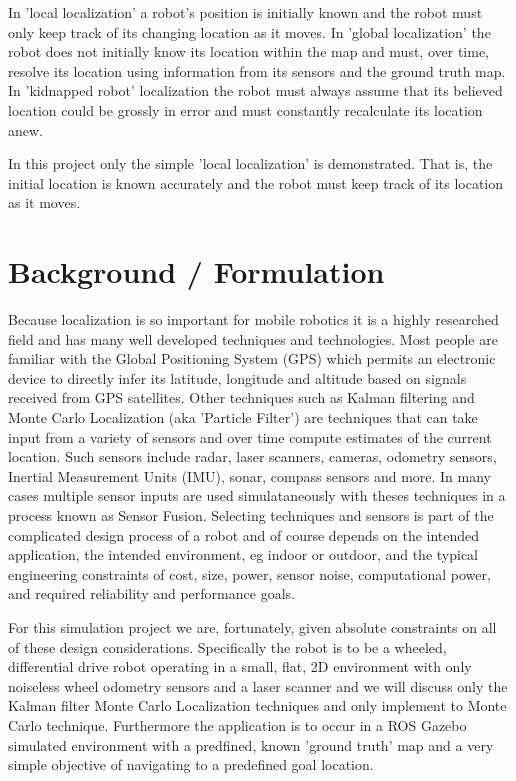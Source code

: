 \documentclass[10pt,journal,compsoc]{IEEEtran}
\begin{document}
In 'local localization' a robot's position is initially known and the robot must only keep track of its changing location as it moves. In 'global localization' the robot does not initially know its location within the map and must, over time, resolve its location using information from its sensors and the ground truth map. In 'kidnapped robot' localization the robot must always assume that its believed location could be grossly in error and must constantly recalculate its location anew. \hfill \vspace{\baselineskip}

In this project only the simple 'local localization' is demonstrated. That is, the initial location is known accurately and the robot must keep track of its location as it moves.

\label{sec:introduction}
\section{Background / Formulation}
Because localization is so important for mobile robotics it is a highly researched field and has many well developed techniques and technologies. Most people are familiar with the Global Positioning System (GPS) which permits an electronic device to directly infer its latitude, longitude and altitude based on signals received from GPS satellites. Other techniques such as Kalman filtering and Monte Carlo Localization (aka 'Particle Filter') are techniques that can take input from a variety of sensors and over time compute estimates of the current location. Such sensors include radar, laser scanners, cameras, odometry sensors, Inertial Measurement Units (IMU), sonar, compass sensors and more. In many cases multiple sensor inputs are used simulataneously with theses techniques in a process known as Sensor Fusion. Selecting techniques and sensors is part of the complicated design process of a robot and of course depends on the intended application, the intended environment, eg indoor or outdoor, and the typical engineering constraints of cost, size, power, sensor noise, computational power, and required reliability and performance goals.  \hfill \vspace{\baselineskip}

For this simulation project we are, fortunately, given absolute constraints on all of these design considerations. Specifically the robot is to be a wheeled, differential drive robot operating in a small, flat, 2D environment with only noiseless wheel odometry sensors and a laser scanner and we will discuss only the Kalman filter Monte Carlo Localization techniques and only implement to Monte Carlo technique. Furthermore the application is to occur in a ROS Gazebo simulated environment with a predfined, known 'ground truth' map and a very simple objective of navigating to a predefined goal location.  \hfill \vspace{\baselineskip}
\end{document}
